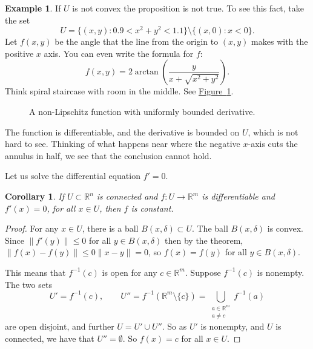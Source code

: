 \documentclass[12pt]{book}
\newcommand{\snorm}[1]{\lVert {#1} \rVert}
\newcommand{\R}{{\mathbb{R}}}
\theoremstyle{plain}
\newtheorem{cor}[thm]{Corollary}
\theoremstyle{remark}
\theoremstyle{definition}
\theoremstyle{exercise}
\theoremstyle{example}
\newtheorem{example}[thm]{Example}
\newcommand{\figureref}[1]{\hyperref[#1]{Figure~\ref*{#1}}}
\begin{document}
\begin{example}
If $U$ is not convex the proposition is not true.  To see this fact, take
the set
\begin{equation*}
U = \{ (x,y) : 0.9 < x^2+y^2 < 1.1 \} \setminus \{ (x,0) : x < 0 \} .
\end{equation*}
Let $f(x,y)$ be the angle that the line from the origin to $(x,y)$
makes with the positive $x$ axis.  You can even write the formula for $f$:
\begin{equation*}
f(x,y) = 2 \operatorname{arctan}\left( \frac{y}{x+\sqrt{x^2+y^2}}\right) .
\end{equation*}
Think spiral staircase with room in the middle.  See
\figureref{mv:fignonlip}.

\begin{figure}[h!t]
\begin{center}

\caption{A non-Lipschitz function with uniformly bounded
derivative.\label{mv:fignonlip}}
\end{center}
\end{figure}

The function is differentiable,
and the derivative is bounded on $U$, which is not hard to see.   Thinking of
what happens near where the negative $x$-axis cuts the annulus in half,
we see that the conclusion cannot hold.
\end{example}

Let us solve the differential equation $f' = 0$.

\begin{cor}
If $U \subset \R^n$ is connected and $f \colon U \to \R^m$ is differentiable
and $f'(x) = 0$, for all $x \in U$, then $f$ is constant.
\end{cor}

\begin{proof}
For any $x \in U$, there is a ball $B(x,\delta) \subset U$.  The ball
$B(x,\delta)$ is convex.  Since
$\snorm{f'(y)} \leq 0$ for all $y \in B(x,\delta)$ then by the theorem,
$\snorm{f(x)-f(y)} \leq 0 \snorm{x-y} = 0$, so $f(x) = f(y)$ for all $y \in
B(x,\delta)$.

This means that $f^{-1}(c)$ is open for any $c \in \R^m$.  Suppose
$f^{-1}(c)$ is nonempty.  
The two sets
\begin{equation*}
U' = f^{-1}(c), \qquad U'' = f^{-1}(\R^m\setminus\{c\}) =
\bigcup_{\substack{a \in \R^m\\a\neq c}} f^{-1}(a)
\end{equation*}
are open disjoint, and further $U = U' \cup U''$.  So as $U'$ is nonempty,
and $U$ is connected,
we have that $U'' = \emptyset$.  So $f(x) = c$ for all $x \in U$.
\end{proof}
\end{document}
